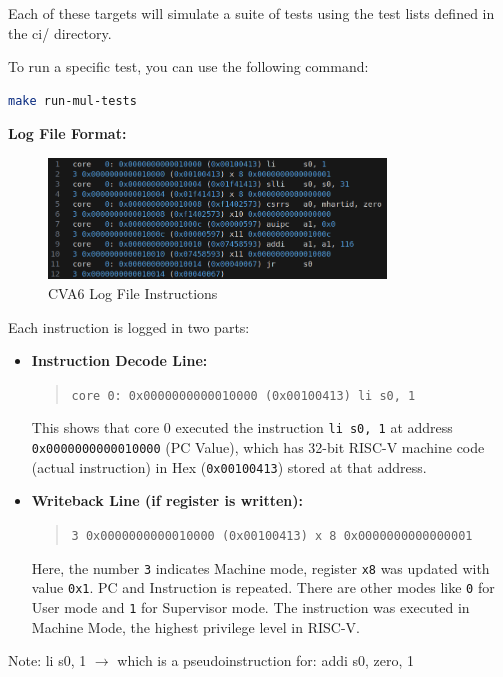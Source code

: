 \documentclass[12pt, a4paper]{article}
\begin{document}
Each of these targets will simulate a suite of tests using the test lists defined in the ci/ directory.

To run a specific test, you can use the following command:
\begin{lstlisting}[language=bash, frame=single, basicstyle=\ttfamily\footnotesize, numbers = none]
   make run-mul-tests
\end{lstlisting}

\textbf{Log File Format:}

\begin{figure}[h]
    \centering
    \includegraphics[width=0.8\textwidth]{cva6_log_file.png}
    \caption{CVA6 Log File Instructions}
    \label{fig:cva6_log_format}
\end{figure}

Each instruction is logged in two parts:
\begin{itemize}
  \item \textbf{Instruction Decode Line:}
  \begin{quote}
    \texttt{core   0: 0x0000000000010000 (0x00100413) li s0, 1}
  \end{quote}
  This shows that core 0 executed the instruction \texttt{li s0, 1} at address \texttt{0x0000000000010000} (PC Value), which has 32-bit RISC-V machine code (actual instruction) in Hex (\texttt{0x00100413}) stored at that address.

  \item \textbf{Writeback Line (if register is written):}
  \begin{quote}
    \texttt{3 0x0000000000010000 (0x00100413) x 8 0x0000000000000001}
  \end{quote}
  Here, the number \texttt{3} indicates Machine mode, register \texttt{x8} was updated with value \texttt{0x1}. PC and Instruction is repeated. There are other modes like \texttt{0} for User mode and \texttt{1} for Supervisor mode. The instruction was executed in Machine Mode, the highest privilege level in RISC-V.
\end{itemize}

Note: 
li s0, 1  $\rightarrow$ which is a pseudoinstruction for: addi s0, zero, 1
\end{document}
